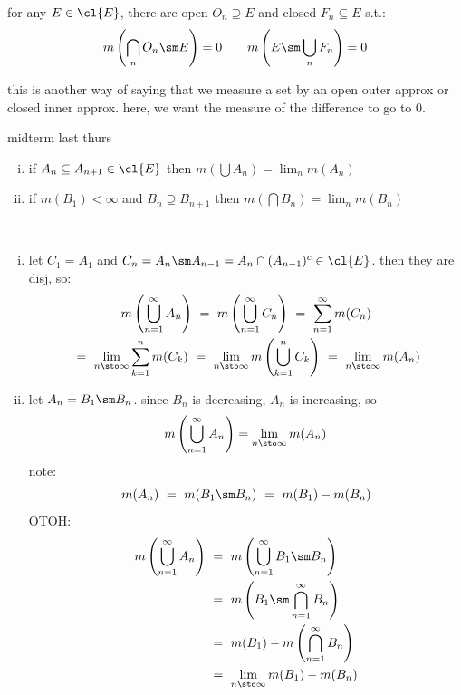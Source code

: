 \begin{crll}
	for any $E\in\cl{E}$, there are open $O_{n}\supseteq E$ and closed $F_{n}\subseteq E$ s.t.:
	\begin{equation*}
		m\left(\bigcap_{n}O_{n}\sm E\right) = 0 \qquad
		m\left(E\sm\bigcup_{n}F_{n}\right) = 0
	\end{equation*}
\end{crll}
this is another way of saying that we measure a set by 
an open outer approx or closed inner approx.
here, we want the measure of the difference to go to 0.

midterm last thurs

\begin{thm}[title=Continuity of Measure]\vspace{-0.2in}
	\begin{enumerate}[i)]
		\item if $A_{n}\subseteq A_{n+1}\in\cl{E}$ then
			$m\left(\bigcup A_{n}\right)=\lim_{n}m(A_{n})$
		\item if $m(B_{1})<\infty$ and $B_{n}\supseteq B_{n+1}$ then
			$m\left(\bigcap B_{n}\right)=\lim_{n}m(B_{n})$
	\end{enumerate}
\end{thm} \

\begin{pf} \vspace{-0.2in}
	\begin{enumerate}[i)]
		\item let $C_{1}=A_{1}$ and $C_{n}=A_{n}\sm A_{n-1}=A_{n}\cap(A_{n-1})^{c}\in\cl{E}$.
			then they are disj, so:
			\begin{gather*}
				m\left(\bigcup_{n=1}^{\infty}A_{n}\right)
				\ = \ m\left(\bigcup_{n=1}^{\infty}C_{n}\right)
				\ = \ \sum_{n=1}^{\infty}m(C_{n}) \\
				\ = \ \lim_{n\sto\infty}\sum_{k=1}^{n}m(C_{k})
				\ = \ \lim_{n\sto\infty}m\left(\bigcup_{k=1}^{n}C_{k}\right)
				\ = \ \lim_{n\sto\infty}m(A_{n})
			\end{gather*}
		\item let $A_{n}=B_{1}\sm B_{n}$.
			since $B_{n}$ is decreasing, $A_{n}$ is increasing, so
			\begin{equation*}
				m\left(\bigcup_{n=1}^{\infty}A_{n}\right)=\lim_{n\sto\infty}m(A_{n})
			\end{equation*}
			note:
			\begin{equation*}
				m(A_{n}) \ = \ m(B_{1}\sm B_{n}) \ = \ m(B_{1})-m(B_{n})
			\end{equation*}
			OTOH:
			\begin{align*}
				m\left(\bigcup_{n=1}^{\infty}A_{n}\right)
				& \ = \ m\left(\bigcup_{n=1}^{\infty}B_{1}\sm B_{n}\right) \\
				& \ = \ m\left(B_{1}\sm \bigcap_{n=1}^{\infty}B_{n}\right) \\
				& \ = \ m(B_{1})-m\left(\bigcap_{n=1}^{\infty}B_{n}\right) \\
				& \ = \ \lim_{n\sto\infty}m(B_{1})-m(B_{n})
			\end{align*}
	\end{enumerate}
\end{pf}

